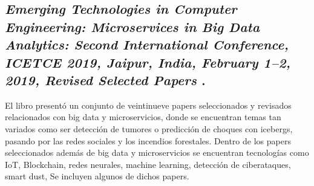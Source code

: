\subsection{
    \textbf{\emph{Emerging Technologies in Computer Engineering: Microservices in Big Data Analytics: Second International Conference, {ICETCE} 2019, Jaipur, India, February 1–2, 2019, Revised Selected Papers}
    }
    \cite{somani_emerging_2019}.
}

El libro presentó un conjunto de veintinueve papers seleccionados y revisados relacionados con big data y microservicios,
donde se encuentran temas tan variados como ser detección de tumores o predicción de choques con icebergs, pasando por las redes sociales y los incendios forestales.
Dentro de los papers seleccionados además de big data y microservicios se encuentran tecnologías como IoT, Blockchain,
redes neurales, machine learning, detección de ciberataques, smart dust,
Se incluyen algunos de dichos papers.\par







